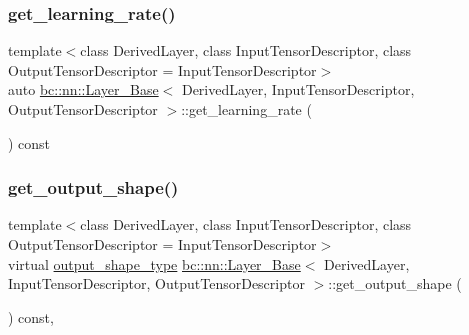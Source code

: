 \mbox{\label{structbc_1_1nn_1_1Layer__Base_a50dc1d02ae682257012f1ad5633f7d48}} 
\subsubsection{\texorpdfstring{get\+\_\+learning\+\_\+rate()}{get\_learning\_rate()}}
{\footnotesize\ttfamily template$<$class Derived\+Layer, class Input\+Tensor\+Descriptor, class Output\+Tensor\+Descriptor = Input\+Tensor\+Descriptor$>$ \\
auto \hyperlink{structbc_1_1nn_1_1Layer__Base}{bc\+::nn\+::\+Layer\+\_\+\+Base}$<$ Derived\+Layer, Input\+Tensor\+Descriptor, Output\+Tensor\+Descriptor $>$\+::get\+\_\+learning\+\_\+rate (\begin{DoxyParamCaption}{ }\end{DoxyParamCaption}) const\hspace{0.3cm}{\ttfamily [inline]}}

\mbox{\label{structbc_1_1nn_1_1Layer__Base_aff66487c94bed067367631b29106a6d9}} 
\subsubsection{\texorpdfstring{get\+\_\+output\+\_\+shape()}{get\_output\_shape()}}
{\footnotesize\ttfamily template$<$class Derived\+Layer, class Input\+Tensor\+Descriptor, class Output\+Tensor\+Descriptor = Input\+Tensor\+Descriptor$>$ \\
virtual \hyperlink{structbc_1_1nn_1_1Layer__Output__Base_aa627047014ee5dff2b9cc1804c791815}{output\+\_\+shape\+\_\+type} \hyperlink{structbc_1_1nn_1_1Layer__Base}{bc\+::nn\+::\+Layer\+\_\+\+Base}$<$ Derived\+Layer, Input\+Tensor\+Descriptor, Output\+Tensor\+Descriptor $>$\+::get\+\_\+output\+\_\+shape (\begin{DoxyParamCaption}{ }\end{DoxyParamCaption}) const\hspace{0.3cm}{\ttfamily [inline]}, {\ttfamily [virtual]}}

